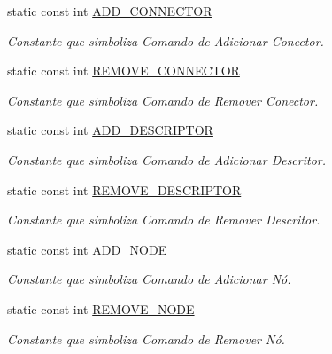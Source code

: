 \begin{DoxyCompactItemize}
static const int \hyperlink{classbr_1_1ufscar_1_1lince_1_1ginga_1_1wac_1_1editing_1_1EditingCommand_a78eb46d12ac97acda15cc25cad21e5b7}{ADD\_\-CONNECTOR}
\begin{DoxyCompactList}\small\item\em Constante que simboliza Comando de Adicionar Conector. \item\end{DoxyCompactList}\item 
static const int \hyperlink{classbr_1_1ufscar_1_1lince_1_1ginga_1_1wac_1_1editing_1_1EditingCommand_a6914135f126f35caef9da25f88c576c7}{REMOVE\_\-CONNECTOR}
\begin{DoxyCompactList}\small\item\em Constante que simboliza Comando de Remover Conector. \item\end{DoxyCompactList}\item 
static const int \hyperlink{classbr_1_1ufscar_1_1lince_1_1ginga_1_1wac_1_1editing_1_1EditingCommand_aaea800af619e90359484819451c9d5dd}{ADD\_\-DESCRIPTOR}
\begin{DoxyCompactList}\small\item\em Constante que simboliza Comando de Adicionar Descritor. \item\end{DoxyCompactList}\item 
static const int \hyperlink{classbr_1_1ufscar_1_1lince_1_1ginga_1_1wac_1_1editing_1_1EditingCommand_ab477428f9223587f306c0b1bdf46997f}{REMOVE\_\-DESCRIPTOR}
\begin{DoxyCompactList}\small\item\em Constante que simboliza Comando de Remover Descritor. \item\end{DoxyCompactList}\item 
static const int \hyperlink{classbr_1_1ufscar_1_1lince_1_1ginga_1_1wac_1_1editing_1_1EditingCommand_a16171b0dc6db42495b4ebc69b0e71deb}{ADD\_\-NODE}
\begin{DoxyCompactList}\small\item\em Constante que simboliza Comando de Adicionar Nó. \item\end{DoxyCompactList}\item 
static const int \hyperlink{classbr_1_1ufscar_1_1lince_1_1ginga_1_1wac_1_1editing_1_1EditingCommand_a7071ed34b67f903c7467b272143aec07}{REMOVE\_\-NODE}
\begin{DoxyCompactList}\small\item\em Constante que simboliza Comando de Remover Nó. \item\end{DoxyCompactList}\item 

\end{DoxyCompactItemize}
